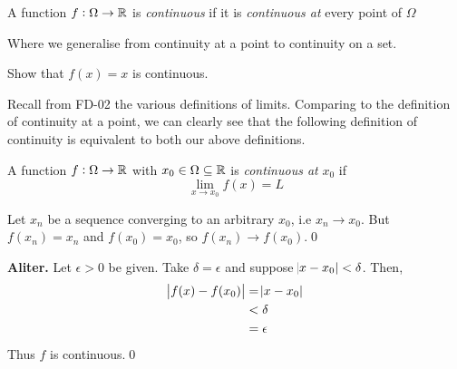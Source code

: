 \begin{SNP}{\dfn}{A function $f:\Omega \rightarrow \mathbb{R}$ is \emph{continuous} if it is \emph{continuous at} every point of $\Omega$}
\end{SNP}

Where we generalise from continuity at a point to continuity on a set.

\begin{SNP}{\ex}{Show that $f(x) = x$ is continuous.}
\end{SNP}

Recall from FD-02 the various definitions of limits. Comparing to the definition of continuity at a point, we can clearly see that the following definition of continuity is equivalent to both our above definitions.
\begin{SNP}{\dfn}{A function $f:\Omega \rightarrow \mathbb{R}$ with $x_0 \in \Omega \subseteq \mathbb{R}$ is \emph{continuous at} $x_0$ if
$$
\lim_{x\rightarrow x_0} f(x) = L
$$}
\end{SNP}
\AnswerSection
\ans Let $x_n$ be a sequence converging to an arbitrary $x_0$, i.e $x_n \rightarrow x_0$. But $f(x_n) = x_n$ and $f(x_0) = x_0$, so $f(x_n) \rightarrow f(x_0)$.\qed

\textbf{Aliter.} Let $\epsilon > 0$ be given. Take $\delta = \epsilon$ and suppose $\abs{x - x_0} < \delta$. Then,
\begin{align*}
\abs{f(x) - f(x_0)} &= \abs{x - x_0}\\
					&< \delta \\
					&= \epsilon
\end{align*}
Thus $f$ is continuous.\qed
